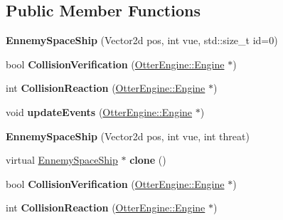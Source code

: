 \subsection*{Public Member Functions}
\begin{DoxyCompactItemize}
\item 
{\bfseries Ennemy\+Space\+Ship} (Vector2d pos, int vue, std\+::size\+\_\+t id=0)\hypertarget{class_ennemy_space_ship_a2bfc1997443e6dc251692baf80391d5b}{}\label{class_ennemy_space_ship_a2bfc1997443e6dc251692baf80391d5b}

\item 
bool {\bfseries Collision\+Verification} (\hyperlink{class_otter_engine_1_1_engine}{Otter\+Engine\+::\+Engine} $\ast$)\hypertarget{class_ennemy_space_ship_a9e516e7678070bb882ccc1452b59e59b}{}\label{class_ennemy_space_ship_a9e516e7678070bb882ccc1452b59e59b}

\item 
int {\bfseries Collision\+Reaction} (\hyperlink{class_otter_engine_1_1_engine}{Otter\+Engine\+::\+Engine} $\ast$)\hypertarget{class_ennemy_space_ship_a784aec309b121c0cc5010df59c6e2c16}{}\label{class_ennemy_space_ship_a784aec309b121c0cc5010df59c6e2c16}

\item 
void {\bfseries update\+Events} (\hyperlink{class_otter_engine_1_1_engine}{Otter\+Engine\+::\+Engine} $\ast$)\hypertarget{class_ennemy_space_ship_a4c6fb1607445f68fedc14f915c29189a}{}\label{class_ennemy_space_ship_a4c6fb1607445f68fedc14f915c29189a}

\item 
{\bfseries Ennemy\+Space\+Ship} (Vector2d pos, int vue, int threat)\hypertarget{class_ennemy_space_ship_aa15af6863c1464c8bcec84cfd3636538}{}\label{class_ennemy_space_ship_aa15af6863c1464c8bcec84cfd3636538}

\item 
virtual \hyperlink{class_ennemy_space_ship}{Ennemy\+Space\+Ship} $\ast$ {\bfseries clone} ()\hypertarget{class_ennemy_space_ship_a81a42fd5fa62fe967546309d90cd1b62}{}\label{class_ennemy_space_ship_a81a42fd5fa62fe967546309d90cd1b62}

\item 
bool {\bfseries Collision\+Verification} (\hyperlink{class_otter_engine_1_1_engine}{Otter\+Engine\+::\+Engine} $\ast$)\hypertarget{class_ennemy_space_ship_a9e516e7678070bb882ccc1452b59e59b}{}\label{class_ennemy_space_ship_a9e516e7678070bb882ccc1452b59e59b}

\item 
int {\bfseries Collision\+Reaction} (\hyperlink{class_otter_engine_1_1_engine}{Otter\+Engine\+::\+Engine} $\ast$)\hypertarget{class_ennemy_space_ship_a784aec309b121c0cc5010df59c6e2c16}{}\label{class_ennemy_space_ship_a784aec309b121c0cc5010df59c6e2c16}


\end{DoxyCompactItemize}
